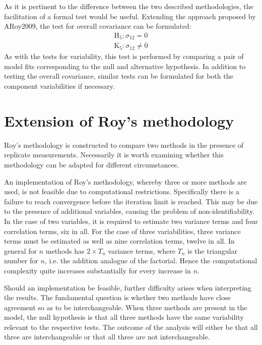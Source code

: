 \documentclass[12pt, a4paper]{report}
\theoremstyle{plain}
\theoremstyle{definition}
\theoremstyle{remark}
\begin{document}
			As it is pertinent to the difference between the two described methodologies, the facilitation of a formal test would be useful. Extending the approach proposed by ARoy2009, the test for overall covariance can be formulated:
			\begin{eqnarray*}
				\operatorname{H_5} : \sigma_{12} = 0 \\
				\operatorname{K_5} : \sigma_{12} \neq 0
			\end{eqnarray*}
			As with the tests for variability, this test is performed by comparing a pair of model fits corresponding to the null and alternative hypothesis. In addition to testing the overall covariance, similar tests can be formulated for both the component variabilities if necessary.
			
			
			
			
			\section{Extension of Roy's methodology}
			Roy's methodology is constructed to compare two methods in the presence of replicate measurements. Necessarily it is worth examining whether this methodology can be adapted for different circumstances.
			
			An implementation of Roy's methodology, whereby three or more methods are used, is not feasible due to computational restrictions. Specifically there is a failure to reach convergence before the iteration limit is reached. This may be due to the presence of additional variables, causing the problem of non-identifiability. In the case of two variables, it is required to estimate two variance terms and four correlation terms, six in all. For the case of three variabilities, three variance terms must be estimated as well as nine correlation terms, twelve in all. In general for $n$ methods has $2 \times T_{n}$ variance terms, where $T_n$ is the triangular number for $n$, i.e. the addition analogue of the factorial. Hence the computational complexity quite increases substantially for every increase in $n$.
			
			Should an implementation be feasible, further difficulty arises when interpreting the results. The fundamental question is whether two methods have close agreement so as to be interchangeable. When three methods are present in the model, the null hypothesis is that all three methods have the same variability relevant to the respective tests. The outcome of the analysis will either be that all three are interchangeable or that all three are not interchangeable.
			
\end{document}
